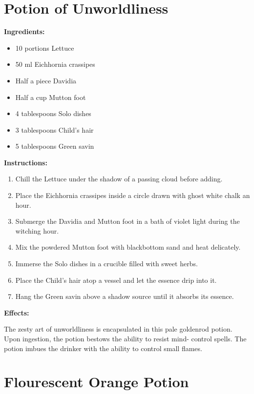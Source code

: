 \documentclass{article}
\begin{document}
\newpage
\section*{Potion of Unworldliness}

\textbf{Ingredients:}

\begin{itemize}
  \item 10 portions Lettuce
  \item 50 ml Eichhornia crassipes
  \item Half a piece Davidia
  \item Half a cup Mutton foot
  \item 4 tablespoons Solo dishes
  \item 3 tablespoons Child's hair
  \item 5 tablespoons Green savin
\end{itemize}

\textbf{Instructions:}

\begin{enumerate}
  \item Chill the Lettuce under the shadow of a passing cloud before adding.
  \item Place the Eichhornia crassipes inside a circle drawn with ghost white chalk an hour.
  \item Submerge the Davidia and Mutton foot in a bath of violet light during the witching hour.
  \item Mix the powdered Mutton foot with blackbottom sand and heat delicately.
  \item Immerse the Solo dishes in a crucible filled with sweet herbs.
  \item Place the Child's hair atop a vessel and let the essence drip into it.
  \item Hang the Green savin above a shadow source until it absorbs its essence.
\end{enumerate}

\textbf{Effects:}

The zesty art of unworldliness is encapsulated in this pale goldenrod potion. Upon ingestion, the potion bestows the ability to resist mind- control spells. The potion imbues the drinker with the ability to control small flames.

\newpage
\section*{Flourescent Orange Potion}
\end{document}
